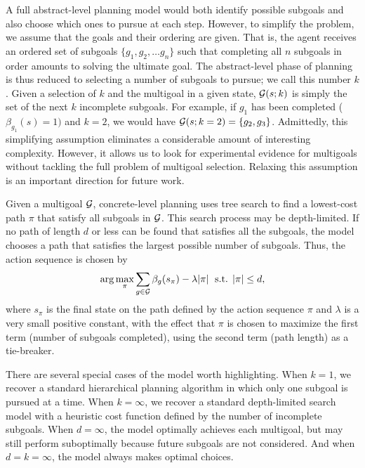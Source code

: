 \documentclass[10pt,letterpaper]{article}
\begin{document}
A full abstract-level planning model would both identify possible subgoals and also choose which ones to pursue at each step. However, to simplify the problem, we assume that the goals and their ordering are given. That is, the agent receives an ordered set of subgoals $\{ g_1, g_2, \dots g_n  \}$ such that completing all $n$ subgoals in order amounts to solving the ultimate goal. The abstract-level phase of planning is thus reduced to selecting a number of subgoals to pursue; we call this number $k$. Given a selection of $k$ and the multigoal in a given state, $\mathcal{G}(s; k)$ is simply the set of the next $k$ incomplete subgoals. For example, if $g_1$ has been completed ($\beta_{g_1}(s) = 1)$ and $k=2$, we would have $\mathcal{G}(s; k=2) = \{ g_2, g_3 \}$. Admittedly, this simplifying assumption eliminates a considerable amount of interesting complexity. However, it allows us to look for experimental evidence for multigoals without tackling the full problem of multigoal selection. Relaxing this assumption is an important direction for future work.


Given a multigoal $\mathcal{G}$, concrete-level planning uses tree search to find a lowest-cost path $\pi$ that satisfy all subgoals in $\mathcal{G}$. This search process may be depth-limited. If no path of length $d$ or less can be found that satisfies all the subgoals, the model chooses a path that satisfies the largest possible number of subgoals. Thus, the action sequence is chosen by
%
\begin{equation}\label{eq:concrete}
  \arg\max_\pi 
    \sum_{g \in \mathcal{G}} \beta_g(s_\pi) - \lambda |\pi |
    \; \text{ s.t.  } |\pi| \leq d,
\end{equation}
%
where $s_\pi$ is the final state on the path defined by the action sequence $\pi$ and $\lambda$ is a very small positive constant, with the effect that $\pi$ is chosen to maximize the first term (number of subgoals completed), using the second term (path length) as a tie-breaker.

There are several special cases of the model worth highlighting. When $k = 1$, we recover a standard hierarchical planning algorithm in which only one subgoal is pursued at a time. When $k = \infty$, we recover a standard depth-limited search model with a heuristic cost function defined by the number of incomplete subgoals. When $d = \infty$, the model optimally achieves each multigoal, but may still perform suboptimally because future subgoals are not considered. And when $d = k = \infty$, the model always makes optimal choices.
\end{document}
